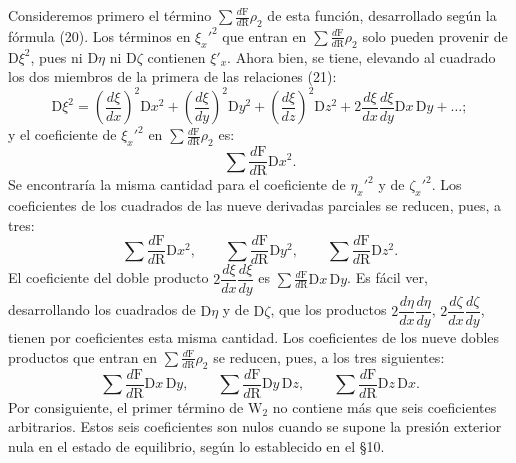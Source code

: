 Consideremos primero el término $\displaystyle\sum\frac{d\mathrm{F}}{d\mathrm{R}}\rho_2$
de esta función, desarrollado según la fórmula (20). Los términos en
$\xi_x'^2$ que entran en $\displaystyle\sum\frac{d\mathrm{F}}{d\mathrm{R}}\rho_2$
solo pueden provenir de $\mathrm{D}\xi^2$, pues ni $\mathrm{D}\eta$ ni
$\mathrm{D}\zeta$ contienen $\xi'_x$. Ahora bien, se tiene, elevando al
cuadrado los dos miembros de la primera de las relaciones (21):
\[
\mathrm{D}\xi^2=\left(\frac{d\xi}{dx}\right)^2\mathrm{D}x^2
+\left(\frac{d\xi}{dy}\right)^2\mathrm{D}y^2+\left(\frac{d\xi}{dz}\right)^2\mathrm{D}z^2
+2\frac{d\xi}{dx}\frac{d\xi}{dy}\mathrm{D}x\,\mathrm{D}y+\ldots;
\]
y el coeficiente de $\xi_x'^2$ en $\displaystyle\sum\frac{d\mathrm{F}}{d\mathrm{R}}\rho_2$ es:
\[
\sum\frac{d\mathrm{F}}{d\mathrm{R}}\mathrm{D}x^2.
\]
Se encontraría la misma cantidad para el coeficiente de $\eta_x'^2$ y de
$\zeta_x'^2$. Los coeficientes de los cuadrados de las nueve derivadas
parciales se reducen, pues, a tres:
\[
\sum\frac{d\mathrm{F}}{d\mathrm{R}}\mathrm{D}x^2,\qquad
\sum\frac{d\mathrm{F}}{d\mathrm{R}}\mathrm{D}y^2,\qquad
\sum\frac{d\mathrm{F}}{d\mathrm{R}}\mathrm{D}z^2.
\]
El coeficiente del doble producto $2\dfrac{d\xi}{dx}\dfrac{d\xi}{dy}$ es
$\displaystyle\sum\frac{d\mathrm{F}}{d\mathrm{R}}\mathrm{D}x\,\mathrm{D}y$.
Es fácil ver, desarrollando los cuadrados de $\mathrm{D}\eta$ y de
$\mathrm{D}\zeta$, que los productos $2\dfrac{d\eta}{dx}\dfrac{d\eta}{dy}$,
$2\dfrac{d\zeta}{dx}\dfrac{d\zeta}{dy}$, tienen por coeficientes esta misma
cantidad. Los coeficientes de los nueve dobles productos que entran en
$\displaystyle\sum\frac{d\mathrm{F}}{d\mathrm{R}}\rho_2$ se reducen, pues, a
los tres siguientes:
\[
\sum\frac{d\mathrm{F}}{d\mathrm{R}}\mathrm{D}x\,\mathrm{D}y,\qquad
\sum\frac{d\mathrm{F}}{d\mathrm{R}}\mathrm{D}y\,\mathrm{D}z,\qquad
\sum\frac{d\mathrm{F}}{d\mathrm{R}}\mathrm{D}z\,\mathrm{D}x.
\]
Por consiguiente, el primer término de $\mathrm{W}_2$ no contiene más que
seis coeficientes arbitrarios. Estos seis coeficientes son nulos cuando se
supone la presión exterior nula en el estado de equilibrio, según lo
establecido en el §10.

